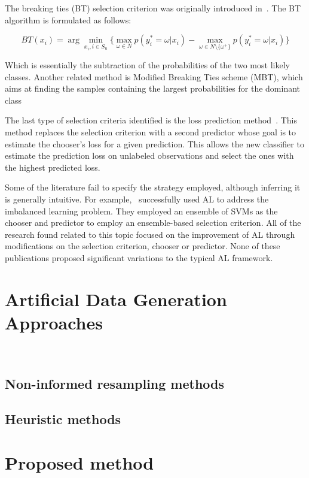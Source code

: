 \documentclass[parskip=full]{scrartcl}
\begin{document}
The breaking ties (BT) selection criterion was originally introduced in~\cite{Luo2003}. The BT
algorithm is formulated as follows:

\begin{equation}
    BT(x_i) = \arg \min_{x_i, i \in S_u}\{ \max_{\omega \in N}{p(y_{i}^{*}=\omega|x_i)} -
    \max_{\omega \in N\setminus\{\omega^{+}\}}{p(y_{i}^{*}=\omega|x_i)}\}
\end{equation}

Which is essentially the subtraction of the probabilities of the two most likely classes. Another
related method is Modified Breaking Ties scheme (MBT), which aims at finding the samples containing
the largest probabilities for the dominant class~\cite{Liu2018,Li2013a}

The last type of selection criteria identified is the loss prediction method~\cite{Yoo2019}. This
method replaces the selection criterion with a second predictor whose goal is to estimate the
chooser's loss for a given prediction. This allows the new classifier to estimate the prediction
loss on unlabeled observations and select the ones with the highest predicted loss.

Some of the literature fail to specify the strategy employed, although inferring it is generally
intuitive. For example,~\cite{Ertekin2007} successfully used AL to address the imbalanced learning
problem. They employed an ensemble of SVMs as the chooser and predictor to employ an ensemble-based
selection criterion. All of the research found related to this topic focused on the improvement of AL
through modifications on the selection criterion, chooser or predictor. None of these publications
proposed significant variations to the typical AL framework.

\section{Artificial Data Generation Approaches}~\label{sec:ovs-sota}

\subsection{Non-informed resampling methods}

\subsection{Heuristic methods}

\section{Proposed method}~\label{sec:proposed-method}
\end{document}
